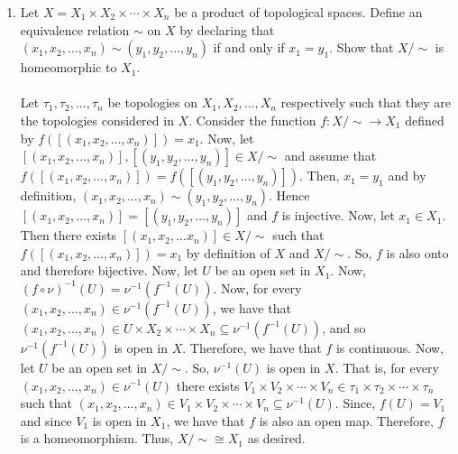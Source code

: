 \documentclass[12pt]{article}
\begin{document}
\begin{enumerate}
\item Let $X=X_1\times X_2\times \cdots \times X_n$ be a product of topological spaces. Define an equivalence relation $\sim$ on $X$ by declaring that $(x_1, x_2, \ldots,x_n)\sim (y_1,y_2,\ldots,y_n)$ if and only if $x_1 = y_1$. Show that $X/\sim$ is homeomorphic to $X_1$.\\\\
Let $\tau_1, \tau_2,\ldots, \tau_n$ be topologies on $X_1, X_2,\ldots, X_n$ respectively such that they are the topologies considered in $X$. Consider the function $f:X/\sim\rightarrow X_1$ defined by $f([(x_1, x_2,\ldots, x_n)])=x_1$. Now, let $[(x_1, x_2,\ldots, x_n)],[(y_1, y_2,\ldots, y_n)]\in X/\sim$ and assume that $f([(x_1, x_2,\ldots, x_n)])=f([(y_1, y_2,\ldots, y_n)])$. Then, $x_1=y_1$ and by definition, $(x_1, x_2, \ldots,x_n)\sim (y_1,y_2,\ldots,y_n)$. Hence $[(x_1, x_2, \ldots,x_n)]=[(y_1,y_2,\ldots,y_n)]$ and $f$ is injective. Now, let $x_1\in X_1$. Then there exists $[(x_1, x_2,\ldots x_n)]\in X/\sim$ such that $f([(x_1, x_2,\ldots, x_n)])=x_1$ by definition of $X$ and $X/\sim$. So, $f$ is also onto and therefore bijective. Now, let $U$ be an open set in $X_1$. Now, $(f\circ\nu)^{-1}(U)=\nu^{-1}(f^{-1}(U))$. Now, for every $(x_1, x_2,\ldots, x_n)\in\nu^{-1}(f^{-1}(U))$, we have that $(x_1, x_2,\ldots, x_n)\in U\times X_2\times\cdots\times X_n\subseteq\nu^{-1}(f^{-1}(U))$, and so $\nu^{-1}(f^{-1}(U))$ is open in $X$. Therefore, we have that $f$ is continuous. Now, let $U$ be an open set in $X/\sim$. So, $\nu^{-1}(U)$ is open in $X$. That is, for every $(x_1, x_2,\ldots, x_n)\in\nu^{-1}(U)$ there exists $V_1\times V_2\times\cdots\times V_n\in\tau_1\times\tau_2\times\cdots\times\tau_n$ such that $(x_1, x_2,\ldots, x_n)\in V_1\times V_2\times\cdots\times V_n\subseteq\nu^{-1}(U)$. Since, $f(U)=V_1$ and since $V_1$ is open in $X_1$, we have that $f$ is also an open map. Therefore, $f$ is a homeomorphism. Thus, $X/\sim\cong X_1$ as desired.


\end{enumerate}
\end{document}
